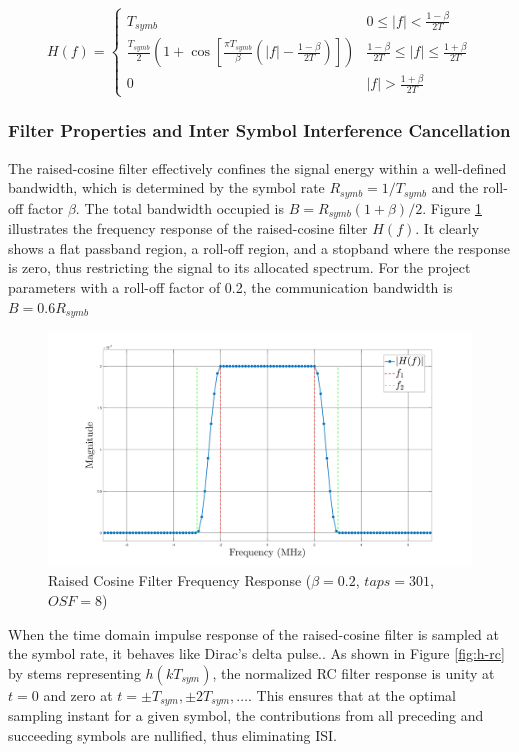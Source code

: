 \begin{equation}
	H(f) = \begin{cases}
		T_{symb} & 0 \le |f| < \frac{1-\beta}{2T} \\
		\frac{T_{symb}}{2} \left(1 + \cos\left[\frac{\pi T_{symb}}{\beta}\left(|f| - \frac{1-\beta}{2T}\right)\right]\right) & \frac{1-\beta}{2T} \le |f| \le \frac{1+\beta}{2T} \\
		0 & |f| > \frac{1+\beta}{2T}
	\end{cases}
\end{equation}



\subsubsection{Filter Properties and Inter Symbol Interference Cancellation}
The raised-cosine filter effectively confines the signal energy within a well-defined bandwidth, which is determined by the symbol rate $R_{symb} = 1/T_{symb}$ and the roll-off factor $\beta$. The total bandwidth occupied is $B = R_{symb} (1+\beta)/2$. Figure \ref{fig:h-rc-freq} illustrates the frequency response of the raised-cosine filter $H(f)$. It clearly shows a flat passband region, a roll-off region, and a stopband where the response is zero, thus restricting the signal to its allocated spectrum. For the project parameters with a roll-off factor of 0.2, the communication bandwidth is $B = 0.6 R_{symb}$

\begin{figure}[H]
	\centering
	\includegraphics[width=0.9\linewidth]{Images/h-rc-freq}
	\caption{Raised Cosine Filter Frequency Response  ($\beta = 0.2$, $taps = 301$, $OSF = 8$)}
	\label{fig:h-rc-freq}
\end{figure}

When the time domain impulse response of the raised-cosine filter is sampled at the symbol rate, it behaves like Dirac's delta pulse.. As shown in Figure \ref{fig:h-rc} by stems representing $h(kT_{sym})$, the normalized RC filter response is unity at $t=0$ and zero at $t = \pm T_{sym}, \pm 2T_{sym}, \dots$. This ensures that at the optimal sampling instant for a given symbol, the contributions from all preceding and succeeding symbols are nullified, thus eliminating ISI.

